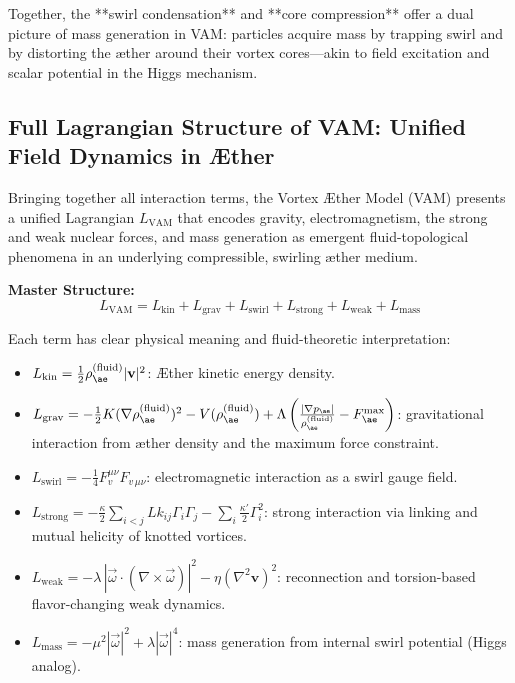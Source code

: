 \medskip
\noindent
Together, the **swirl condensation** and **core compression** offer a dual picture of mass generation in VAM: particles acquire mass by trapping swirl and by distorting the æther around their vortex cores—akin to field excitation and scalar potential in the Higgs mechanism.



\subsection{Full Lagrangian Structure of VAM: Unified Field Dynamics in Æther}

Bringing together all interaction terms, the Vortex Æther Model (VAM) presents a unified Lagrangian \( L_{\text{VAM}} \) that encodes gravity, electromagnetism, the strong and weak nuclear forces, and mass generation as emergent fluid-topological phenomena in an underlying compressible, swirling æther medium.

\vspace{1em}
\noindent
\textbf{Master Structure:}
\begin{equation}
\boxed{
L_{\text{VAM}} = L_{\text{kin}} + L_{\text{grav}} + L_{\text{swirl}} + L_{\text{strong}} + L_{\text{weak}} + L_{\text{mass}}
}
\end{equation}

\noindent
Each term has clear physical meaning and fluid-theoretic interpretation:
\begin{itemize}
    \item \( L_{\text{kin}} = \tfrac{1}{2} \rho_{\ae}^{(\text{fluid})} |\mathbf{v}|^2 \): Æther kinetic energy density.

    \item \( L_{\text{grav}} = -\tfrac{1}{2} K (\nabla \rho_{\ae}^{(\text{fluid})})^2 - V(\rho_{\ae}^{(\text{fluid})}) + \Lambda\left(\frac{|\nabla p_{\ae}|}{\rho_{\ae}^{(\text{fluid})}} - F^{\max}_{\ae} \right) \): gravitational interaction from æther density and the maximum force constraint.

    \item \( L_{\text{swirl}} = -\tfrac{1}{4} F^{\mu\nu}_{v} F_{v\,\mu\nu} \): electromagnetic interaction as a swirl gauge field.

    \item \( L_{\text{strong}} = -\tfrac{\kappa}{2} \sum_{i<j} Lk_{ij} \Gamma_i \Gamma_j - \sum_i \tfrac{\kappa'}{2} \Gamma_i^2 \): strong interaction via linking and mutual helicity of knotted vortices.

    \item \( L_{\text{weak}} = -\lambda \, \left|\vec{\omega} \cdot (\nabla \times \vec{\omega}) \right|^2 - \eta (\nabla^2 \mathbf{v})^2 \): reconnection and torsion-based flavor-changing weak dynamics.

    \item \( L_{\text{mass}} = -\mu^2 |\vec{\omega}|^2 + \lambda |\vec{\omega}|^4 \): mass generation from internal swirl potential (Higgs analog).
\end{itemize}

